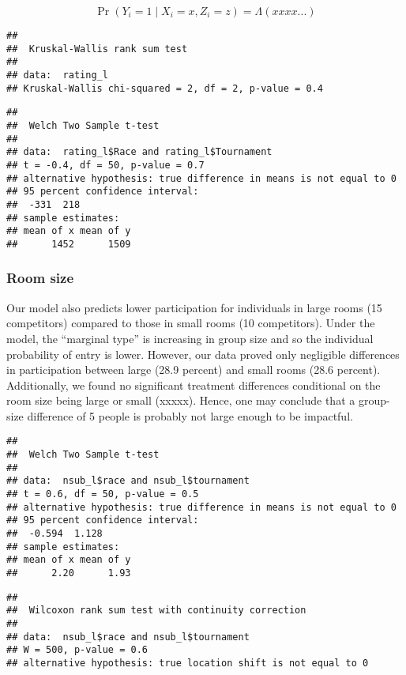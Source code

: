 \documentclass[11pt, titlepage]{article}
\begin{document}
\begin{equation}
    \Pr(Y_i = 1 \mid X_i=x, Z_i=z) = \Lambda (xxxx...) 
\end{equation}

\begin{verbatim}
## 
##  Kruskal-Wallis rank sum test
## 
## data:  rating_l
## Kruskal-Wallis chi-squared = 2, df = 2, p-value = 0.4
\end{verbatim}

\begin{verbatim}
## 
##  Welch Two Sample t-test
## 
## data:  rating_l$Race and rating_l$Tournament
## t = -0.4, df = 50, p-value = 0.7
## alternative hypothesis: true difference in means is not equal to 0
## 95 percent confidence interval:
##  -331  218
## sample estimates:
## mean of x mean of y 
##      1452      1509
\end{verbatim}

\subsubsection{Room size}\label{room-size}

Our model also predicts lower participation for individuals in large
rooms (15 competitors) compared to those in small rooms (10
competitors). Under the model, the ``marginal type'' is increasing in
group size and so the individual probability of entry is lower. However,
our data proved only negligible differences in participation between
large (28.9 percent) and small rooms (28.6 percent). Additionally, we
found no significant treatment differences conditional on the room size
being large or small (xxxxx). Hence, one may conclude that a group-size
difference of 5 people is probably not large enough to be impactful.

\begin{verbatim}
## 
##  Welch Two Sample t-test
## 
## data:  nsub_l$race and nsub_l$tournament
## t = 0.6, df = 50, p-value = 0.5
## alternative hypothesis: true difference in means is not equal to 0
## 95 percent confidence interval:
##  -0.594  1.128
## sample estimates:
## mean of x mean of y 
##      2.20      1.93
\end{verbatim}

\begin{verbatim}
## 
##  Wilcoxon rank sum test with continuity correction
## 
## data:  nsub_l$race and nsub_l$tournament
## W = 500, p-value = 0.6
## alternative hypothesis: true location shift is not equal to 0
\end{verbatim}
\end{document}
